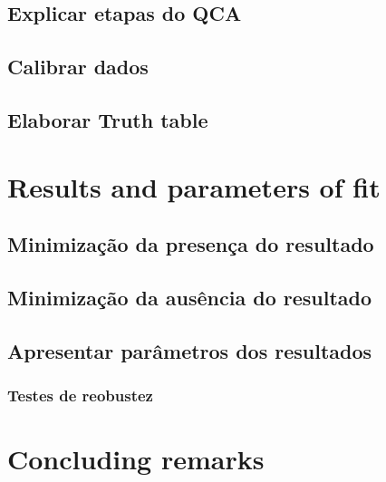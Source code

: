 \documentclass[12pt,openright,oneside,a4paper,english,sumario=tradicional]{gpsabntex}
\numberwithin{listing}{chapter}
\begin{document}
\subsection{Explicar etapas do QCA}
\label{sec:org60502bf}
\subsection{Calibrar dados}
\label{sec:orgf8e9d86}
\subsection{Elaborar Truth table}
\label{sec:orgd66eb9d}
\section{Results and parameters of fit}
\label{sec:orgd91ce8c}
\subsection{Minimização da presença do resultado}
\label{sec:org5a23eb3}
\subsection{Minimização da ausência do resultado}
\label{sec:org8a1207d}
\subsection{Apresentar parâmetros dos resultados}
\label{sec:orgbe8884b}
\subsubsection{Testes de reobustez}
\label{sec:org8bb4ded}

\section{Concluding remarks}
\label{sec:org6eeafd0}

\appendix
\end{document}
